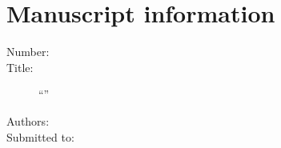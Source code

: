 \section*{Manuscript information}

\begin{description}
\item[Number:] \PaperId
\item[Title:] ``\PaperTitle''
\item[Authors:] \AuthorsInLetter
\item[Submitted to:] \Journal
\end{description}